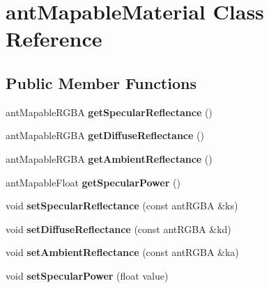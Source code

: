 \hypertarget{classant_mapable_material}{\section{ant\+Mapable\+Material Class Reference}
\label{classant_mapable_material}
}
\subsection*{Public Member Functions}
\begin{DoxyCompactItemize}
\item 
\hypertarget{classant_mapable_material_a50feb06baa5ca81554d51ddbc9ecdc4d}{ant\+Mapable\+R\+G\+B\+A {\bfseries get\+Specular\+Reflectance} ()}\label{classant_mapable_material_a50feb06baa5ca81554d51ddbc9ecdc4d}

\item 
\hypertarget{classant_mapable_material_aeeb76b91fca22130c73e831c8e022103}{ant\+Mapable\+R\+G\+B\+A {\bfseries get\+Diffuse\+Reflectance} ()}\label{classant_mapable_material_aeeb76b91fca22130c73e831c8e022103}

\item 
\hypertarget{classant_mapable_material_a995a2202d70639e91113cfa64ed563b3}{ant\+Mapable\+R\+G\+B\+A {\bfseries get\+Ambient\+Reflectance} ()}\label{classant_mapable_material_a995a2202d70639e91113cfa64ed563b3}

\item 
\hypertarget{classant_mapable_material_a6dd6834917571abaa3369bbc2922bbce}{ant\+Mapable\+Float {\bfseries get\+Specular\+Power} ()}\label{classant_mapable_material_a6dd6834917571abaa3369bbc2922bbce}

\item 
\hypertarget{classant_mapable_material_a2d181376705413e276f28d04620e99c8}{void {\bfseries set\+Specular\+Reflectance} (const ant\+R\+G\+B\+A \&ks)}\label{classant_mapable_material_a2d181376705413e276f28d04620e99c8}

\item 
\hypertarget{classant_mapable_material_a954390cbba17ebcda1315425b4f985e1}{void {\bfseries set\+Diffuse\+Reflectance} (const ant\+R\+G\+B\+A \&kd)}\label{classant_mapable_material_a954390cbba17ebcda1315425b4f985e1}

\item 
\hypertarget{classant_mapable_material_a76a965f898d41f0319723eb24c7e4c94}{void {\bfseries set\+Ambient\+Reflectance} (const ant\+R\+G\+B\+A \&ka)}\label{classant_mapable_material_a76a965f898d41f0319723eb24c7e4c94}

\item 
\hypertarget{classant_mapable_material_a3831528003f09037a624767dfe94367d}{void {\bfseries set\+Specular\+Power} (float value)}\label{classant_mapable_material_a3831528003f09037a624767dfe94367d}

\end{DoxyCompactItemize}
